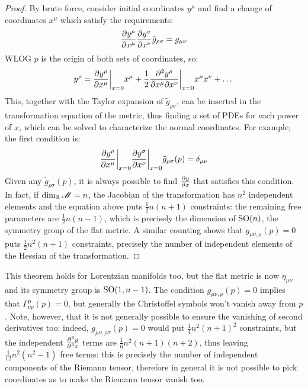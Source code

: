 \begin{proofbox}
  \begin{proof}
    By brute force, consider initial coordinates $ y^\mu $ and find a change of coordinates $ x^\mu $ which satisfy the requirements:
    \begin{equation*}
      \frac{\partial y^\rho}{\partial x^\mu} \frac{\partial y^\sigma}{\partial x^\nu} \tilde{g}_{\rho \sigma} = g_{\mu \nu}
    \end{equation*}
    WLOG $ p $ is the origin of both sets of coordinates, so:
    \begin{equation*}
      y^\rho = \frac{\partial y^\rho}{\partial x^\mu}\bigg\vert_{x = 0} x^\mu + \frac{1}{2} \frac{\partial^2 y^\rho}{\partial x^\mu \partial x^\nu}\bigg\vert_{x = 0} x^\mu x^\nu + \dots
    \end{equation*}
    This, together with the Taylor expansion of $ \tilde{g}_{\rho \sigma} $, can be inserted in the transformation equation of the metric, thus finding a set of PDEs for each power of $ x $, which can be solved to characterize the normal coordinates. For example, the first condition is:
    \begin{equation*}
      \frac{\partial y^\rho}{\partial x^\mu}\bigg\vert_{x = 0} \frac{\partial y^\sigma}{\partial x^\nu}\bigg\vert_{x = 0} \tilde{g}_{\rho \sigma}(p) = \delta_{\mu \nu}
    \end{equation*}
    Given any $ \tilde{g}_{\rho \sigma}(p) $, it is always possible to find $ \frac{\partial y}{\partial x} $ that satisfies this condition. In fact, if $ \dim_{\mathbb{R}} \mathscr{M} = n $, the Jacobian of the transformation has $ n^2 $ independent elements and the equation above puts $ \frac{1}{2} n (n + 1) $ constraints: the remaining free parameters are $ \frac{1}{2} n (n - 1) $, which is precisely the dimension of $ \mathrm{SO}(n) $, the symmetry group of the flat metric.
    A similar counting shows that $ g_{\mu \nu , \rho}(p) = 0 $ puts $ \frac{1}{2} n^2 (n + 1) $ constraints, precisely the number of independent elements of the Hessian of the transformation.
  \end{proof}
\end{proofbox}

This theorem holds for Lorentzian manifolds too, but the flat metric is now $ \eta_{\mu \nu} $ and its symmetry group is $ \mathrm{SO}(1, n-1) $. The condition $ g_{\mu \nu , \rho}(p) = 0 $ implies that $ \Gamma^\mu_{\nu \rho}(p) = 0 $, but generally the Christoffel symbols won't vanish away from $ p $. Note, however, that it is not generally possible to ensure the vanishing of second derivatives too: indeed, $ g_{\mu \nu , \rho \sigma}(p) = 0 $ would put $ \frac{1}{4} n^2 (n + 1)^2 $ constraints, but the independent $ \frac{\partial^3 y}{\partial^3 x} $ terms are $ \frac{1}{6} n^2 (n+1) (n+2) $, thus leaving $ \frac{1}{12} n^2 (n^2 - 1) $ free terms: this is precisely the number of independent components of the Riemann tensor, therefore in general it is not possible to pick coordinates as to make the Riemann tensor vanish too.

